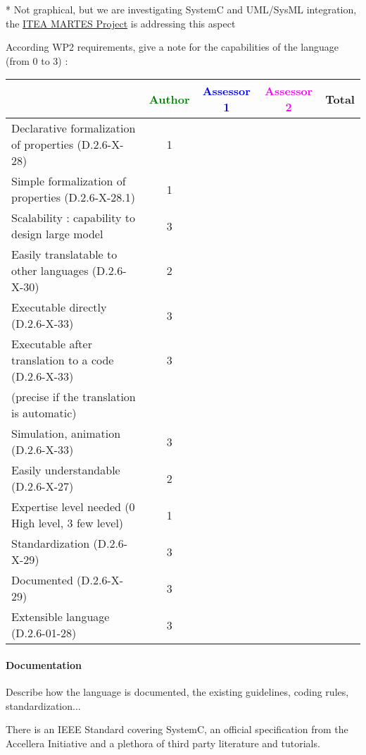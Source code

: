 \begin{author_comment}
* Not graphical, but we are investigating SystemC and UML/SysML integration, the \href{http://www.martes-idea.org/}{ITEA MARTES Project} is addressing this aspect
\end{author_comment}

According WP2 requirements, give a note for the capabilities of the language (from 0 to 3) :

\begin{tabular}{|l | c | c | c | c|}
\hline
& \textcolor{green}{Author} & \textcolor{blue}{Assessor 1} & \textcolor{magenta}{Assessor 2} & Total \\
\hline
Declarative formalization of properties (D.2.6-X-28) &1 & & & \\
\hline
Simple formalization of properties (D.2.6-X-28.1) &1 & & & \\
\hline
Scalability : capability to design large model &3 & & & \\
\hline
Easily translatable to other languages (D.2.6-X-30) &2 & & & \\
\hline
Executable directly (D.2.6-X-33) &3 & & & \\
\hline
Executable after translation to a code (D.2.6-X-33) &3 & & & \\
(precise if the translation is automatic) & & & & \\
\hline
Simulation, animation (D.2.6-X-33) &3 & & & \\
\hline
Easily understandable (D.2.6-X-27) &2 & & & \\
\hline
Expertise level needed (0 High level, 3 few level) &1 & & & \\
\hline
Standardization (D.2.6-X-29) &3 & & & \\
\hline
Documented (D.2.6-X-29) &3 & & & \\
\hline
Extensible language (D.2.6-01-28) &3 & & & \\
\hline
\end{tabular}


\paragraph{Documentation} Describe how the language is documented, the existing guidelines, coding rules, standardization...

There is an IEEE Standard covering SystemC, an official specification from the Accellera Initiative and a plethora of third party literature and tutorials.


